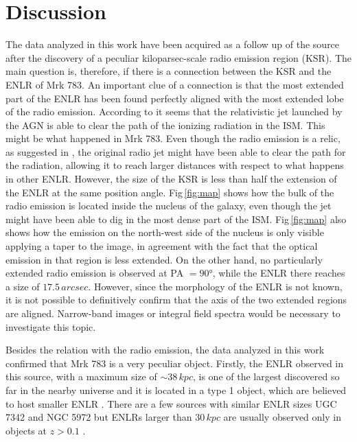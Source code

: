 \documentclass[../main.tex]{subfiles}
\begin{document}
\section{Discussion}
\label{sec:pap3_discussion}

The data analyzed in this work have been acquired as a follow up of the source after the discovery of a peculiar kiloparsec-scale radio emission region (KSR).
The main question is, therefore, if there is a connection between the KSR and the ENLR of Mrk 783.
An important clue of a connection is that the most extended part of the ENLR has been found perfectly aligned with the most extended lobe of the radio emission.
According to \citet{Wilson94} it seems that the relativistic jet launched by the AGN is able to clear the path of the ionizing radiation in the ISM.
This might be what happened in Mrk 783.
Even though the radio emission is a relic, as suggested in \citep{Congiu17}, the original radio jet might have been able to clear the path for the radiation, allowing it to reach larger distances with respect to what happens in other ENLR.
However, the size of the KSR is less than half the extension of the ENLR at the same position angle.
Fig\,\ref{fig:map} shows how the bulk of the radio emission is located inside the nucleus of the galaxy, even though the jet might have been able to dig in the most dense part of the ISM.
Fig\,\ref{fig:map} also shows how the emission on the north-west side of the nucleus is only visible applying a taper to the image, in agreement with the fact that the optical emission in that region is less extended.
On the other hand, no particularly extended radio emission is observed at PA $=\ang{90}$, while the ENLR there reaches a size of $17.5\,\si{arcsec}$.
However, since the morphology of the ENLR is not known, it is not possible to definitively confirm that the axis of the two extended regions are aligned.
Narrow-band images or integral field spectra would be necessary to investigate this topic.


Besides the relation with the radio emission, the data analyzed in this work confirmed that Mrk 783 is a very peculiar object.
Firstly, the ENLR observed in this source, with a maximum size of $\sim 38\,\si{kpc}$, is one of the largest discovered so far in the nearby universe and it is located in a type 1 object, which are believed to host smaller ENLR \citep{Schmitt03b}.
There are a few sources with similar ENLR sizes UGC 7342 and NGC 5972 \citep[$37$ and $33$ kpc respectively][]{Keel12} but ENLRs larger than $30\,\si{kpc}$ are usually observed only in objects at $z>0.1$ \citep[e.g.][]{Stockton87,Humphrey10,Sun18}.
\end{document}
